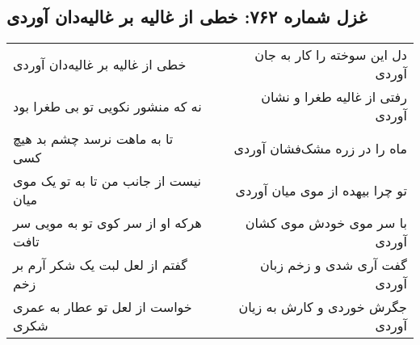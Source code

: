 \begin{center}
\section*{غزل شماره ۷۶۲: خطی از غالیه بر غالیه‌دان آوردی}
\label{sec:762}
\begin{longtable}{l p{0.5cm} r}
خطی از غالیه بر غالیه‌دان آوردی
&&
دل این سوخته را کار به جان آوردی
\\
نه که منشور نکویی تو بی طغرا بود
&&
رفتی از غالیه طغرا و نشان آوردی
\\
تا به ماهت نرسد چشم بد هیچ کسی
&&
ماه را در زره مشک‌فشان آوردی
\\
نیست از جانب من تا به تو یک موی میان
&&
تو چرا بیهده از موی میان آوردی
\\
هرکه او از سر کوی تو به مویی سر تافت
&&
با سر موی خودش موی کشان آوردی
\\
گفتم از لعل لبت یک شکر آرم بر زخم
&&
گفت آری شدی و زخم زبان آوردی
\\
خواست از لعل تو عطار به عمری شکری
&&
جگرش خوردی و کارش به زیان آوردی
\\
\end{longtable}
\end{center}
